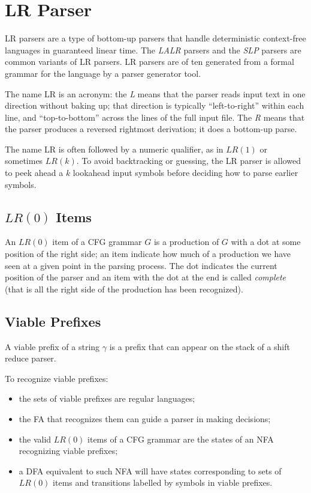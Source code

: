 \section{LR Parser}
LR parsers are a type of bottom-up parsers that handle deterministic context-free languages in guaranteed linear time.
The \emph{LALR} parsers and the \emph{SLP} parsers are common variants of LR parsers.
LR parsers are of ten generated from a formal grammar for the language by a parser generator tool.

The name LR is an acronym: the \emph{L} means that the parser reads input text in one direction without baking up; that direction is typically ``left-to-right'' within each line, and ``top-to-bottom'' across the lines of the full input file.
The \emph{R} means that the parser produces a reversed rightmost derivation; it does a bottom-up parse.

The name LR is often followed by a numeric qualifier, as in $LR(1)$ or sometimes $LR(k)$.
To avoid backtracking or guessing, the LR parser is allowed to peek ahead a $k$ lookahead input symbols before deciding how to parse earlier symbols.

\subsection{$LR(0)$ Items}
An $LR(0)$ item of a CFG grammar $G$ is a production of $G$ with a dot at some position of the right side; an item indicate how much of a production we have seen at a given point in the parsing process.
The dot indicates the current position of the parser and an item with the dot at the end is called \emph{complete} (that is all the right side of the production has been recognized).

\subsection{Viable Prefixes}
A viable prefix of a string $\gamma$ is a prefix that can appear on the stack of a shift reduce parser.

To recognize viable prefixes:
\begin{itemize}
    \item the sets of viable prefixes are regular languages;
    \item the FA that recognizes them can guide a parser in making decisions;
    \item the valid $LR(0)$ items of a CFG grammar are the states of an NFA recognizing viable prefixes;
    \item a DFA equivalent to such NFA will have states corresponding to sets of $LR(0)$ items and transitions labelled by symbols in viable prefixes.
\end{itemize}

